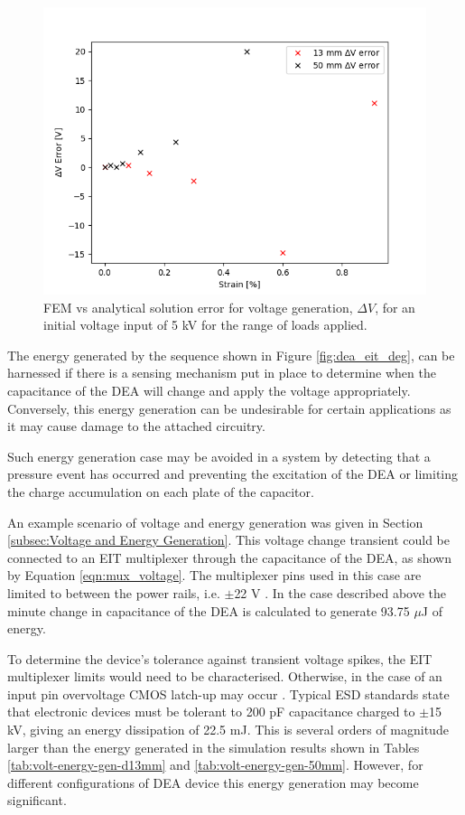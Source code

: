 \begin{figure}[H]
	\centering
	\includegraphics[width=0.65\linewidth]{Figures/plot_DEG_strain_vs_Vgen_err.png}
	\caption{FEM vs analytical solution error for voltage generation, $\Delta V$, for an initial voltage input of 5 kV for the range of loads applied.}
	\label{fig:volt-energy-gen-13_and_50mm_err}
\end{figure}


The energy generated by the sequence shown in Figure \ref{fig:dea_eit_deg}, can be harnessed if there is a sensing mechanism put in place to determine when the capacitance of the DEA will change and apply the voltage appropriately. Conversely, this energy generation can be undesirable for certain applications as it may cause damage to the attached circuitry.

Such energy generation case may be avoided in a system by detecting that a pressure event has occurred and preventing the excitation of the DEA or limiting the charge accumulation on each plate of the capacitor.

An example scenario of voltage and energy generation was given in Section \ref{subsec:Voltage and Energy Generation}. This voltage change transient could be connected to an EIT multiplexer through the capacitance of the DEA, as shown by Equation \ref{eqn:mux_voltage}. The multiplexer pins used in this case are limited to between the power rails, i.e. $\pm$22 V \cite{VishayPG2018}. In the case described above the minute change in capacitance of the DEA is calculated to generate 93.75 $\mu$J of energy.


To determine the device's tolerance against transient voltage spikes, the EIT multiplexer limits would need to be characterised. Otherwise, in the case of an input pin overvoltage CMOS latch-up may occur \cite{Redmond2001} . Typical ESD standards \cite{IEC2008} state that electronic devices must be tolerant to 200 pF capacitance charged to $\pm$15 kV, giving an energy dissipation of 22.5 mJ. This is several orders of magnitude larger than the energy generated in the simulation results shown in Tables \ref{tab:volt-energy-gen-d13mm} and \ref{tab:volt-energy-gen-50mm}. However, for different configurations of DEA device this energy generation may become significant.


